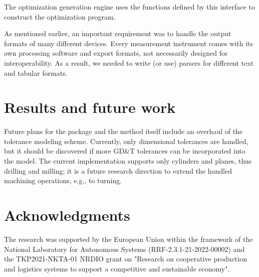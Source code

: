 \documentclass{juliacon}
\begin{document}
The optimization generation engine uses the functions defined by this interface to construct the optimization program.

As mentioned earlier, an important requirement was to handle the output formats of many different devices.
Every measurement instrument comes with its own processing software and export formats, not necessarily designed for interoperability.
As a result, we needed to write (or use) parsers for different text and tabular formats.
\fi

\section{Results and future work}
\label{sec:results}
Future plans for the package and the method itself include an overhaul of the tolerance modeling scheme.
Currently, only dimensional tolerances are handled, but it should be discovered if more GD\&T tolerances can be incorporated into the model.
The current implementation supports only cylinders and planes, thus drilling and milling; it is a future research direction to extend the handled machining operations, e.g., to turning.

\section{Acknowledgments}
The research was supported by the European Union within the framework of the National Laboratory for Autonomous Systems (RRF-2.3.1-21-2022-00002) and the TKP2021-NKTA-01  NRDIO grant on "Research on cooperative production and logistics systems to support a competitive and sustainable economy".


\end{document}
